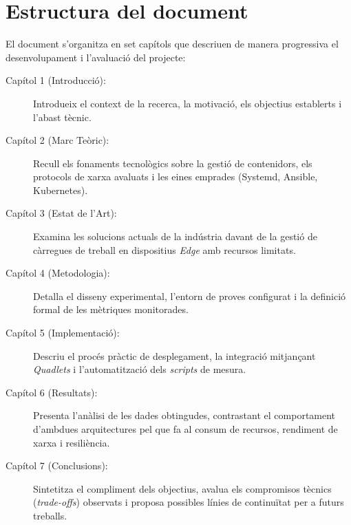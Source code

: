 \section{Estructura del document}
El document s'organitza en set capítols que descriuen de manera progressiva el desenvolupament i l'avaluació del projecte:

\begin{description}
    \item[Capítol 1 (Introducció):] Introdueix el context de la recerca, la motivació, els objectius establerts i l'abast tècnic.
    
    \item[Capítol 2 (Marc Teòric):] Recull els fonaments tecnològics sobre la gestió de contenidors, els protocols de xarxa avaluats i les eines emprades (Systemd, Ansible, Kubernetes).
    
    \item[Capítol 3 (Estat de l'Art):] Examina les solucions actuals de la indústria davant de la gestió de càrregues de treball en dispositius \textit{Edge} amb recursos limitats.
    
    \item[Capítol 4 (Metodologia):] Detalla el disseny experimental, l'entorn de proves configurat i la definició formal de les mètriques monitorades.
    
    \item[Capítol 5 (Implementació):] Descriu el procés pràctic de desplegament, la integració mitjançant \textit{Quadlets} i l'automatització dels \textit{scripts} de mesura.
    
    \item[Capítol 6 (Resultats):] Presenta l'anàlisi de les dades obtingudes, contrastant el comportament d'ambdues arquitectures pel que fa al consum de recursos, rendiment de xarxa i resiliència.
    
    \item[Capítol 7 (Conclusions):] Sintetitza el compliment dels objectius, avalua els compromisos tècnics (\textit{trade-offs}) observats i proposa possibles línies de continuïtat per a futurs treballs.
\end{description}